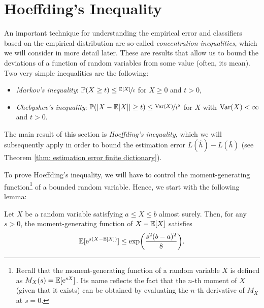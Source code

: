 \section{Hoeffding's Inequality}

An important technique for understanding the empirical error and classifiers based on the empirical distribution are so-called \emph{concentration inequalities}, which we will consider in more detail later. These are results that allow us to bound the deviations of a function of random variables from some value (often, its mean). Two very simple inequalities are the following:

\begin{prop}
\begin{itemize}
    \item \emph{Markov's inequality}: $\operatorname{\mathbb{P}}(X \geq t) \leq \nicefrac{\operatorname{\mathbb{E}}[X]}{t}$ for $X \geq 0$ and $t > 0$,

    \item \emph{Chebyshev’s inequality}: $\operatorname{\mathbb{P}}(\abs{X - \operatorname{\mathbb{E}}[X]} \geq t) \leq \nicefrac{\operatorname{Var}(X)}{t^2}$ for $X$ with $\operatorname{Var}(X) < \infty$ and $t > 0$.
\end{itemize}
\end{prop}

\noindent The main result of this section is \emph{Hoeffding's inequality}, which we will subsequently apply in order to bound the estimation error $L(\hat{h}) - L(\bar{h})$ (see Theorem \ref{thm: estimation error finite dictionary}).

To prove Hoeffding's inequality, we will have to control the moment-generating function\footnote{Recall that the moment-generating function of a random variable $X$ is defined as $M_X(s) = \operatorname{\mathbb{E}}[\mathrm{e}^{sX}]$. Its name reflects the fact that the $n$-th moment of $X$ (given that it exists) can be obtained by evaluating the $n$-th derivative of $M_X$ at $s=0$.} of a bounded random variable. Hence, we start with the following lemma:

\begin{lemma}
\label{lem: hoeffding}
Let $X$ be a random variable satisfying $a \leq X \leq b$ almost surely. Then, for any $s > 0$, the moment-generating function of $X - \operatorname{\mathbb{E}}[X]$ satisfies
\[
    \operatorname{\mathbb{E}}[\mathrm{e}^{s(X - \operatorname{\mathbb{E}}[X])}] \leq \exp(\frac{s^2(b - a)^2}{8}).
\]
\end{lemma}


